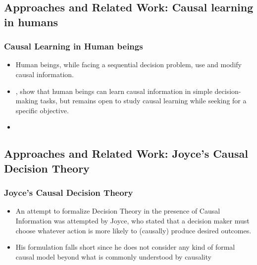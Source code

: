 \documentclass{beamer}
\theoremstyle{plain}
\begin{document}
\subsection{Approaches and Related Work: Causal learning in humans}
\begin{frame}
\frametitle{Causal Learning in Human beings}
\begin{itemize}
\item Human beings, while facing a sequential decision problem, use and modify causal information.
\item \cite{hagmayer2009decision}, \cite{hagmayer2013repeated} show that human beings can learn causal information in simple decision-making tasks, but remains open to study causal learning while seeking for a specific objective. 
\item 
\end{itemize}
\end{frame}
\subsection{Approaches and Related Work: Joyce's Causal Decision Theory}
\begin{frame}
\frametitle{Joyce's Causal Decision Theory}
\begin{itemize}
\item An attempt to formalize Decision Theory in the presence of Causal Information was attempted by Joyce, who stated that a decision maker must choose whatever action is more likely to (causally) produce desired outcomes.
\item  His formulation falls short since he does not consider any kind of formal causal model beyond what is commonly understood by causality
\end{itemize}
\end{frame}
\end{document}
